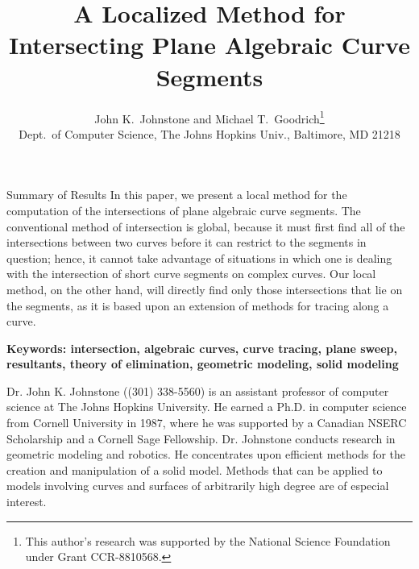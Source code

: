 \newif\ifFull
\Fulltrue		

\DoubleSpace
\setlength{\oddsidemargin}{0pt}
\setlength{\evensidemargin}{0pt}
\setlength{\headsep}{0pt}
\setlength{\topmargin}{0pt}
\setlength{\textheight}{8.75in}
\setlength{\textwidth}{6.5in}
%
\title{A Localized Method for Intersecting Plane Algebraic Curve Segments}
\author{John K.\ Johnstone and Michael T.\ Goodrich\thanks{This 
	author's research was supported by
	the National Science Foundation under Grant CCR-8810568.}
	\\[5pt]
	Dept.\ of Computer Science, The Johns Hopkins Univ., Baltimore,
	MD 21218}
%

%
\maketitle
%
\begin{summary}{Summary of Results}
In this paper, we present a local method for the 
computation of the intersections of plane algebraic curve segments.
The conventional method of intersection is global, because it must first find all 
of the intersections between two curves before it can restrict to the segments in question;
hence, it cannot take advantage of situations in which one is dealing with the intersection of
short curve segments on complex curves.
Our local method, on the other hand, will directly find only those intersections that lie 
on the segments, as it is based upon an extension of methods for tracing along a curve.
\end{summary}

{\bf Keywords: intersection, algebraic curves, curve tracing, plane sweep, resultants,
	theory of elimination, geometric modeling, solid modeling}

Dr. John K. Johnstone ((301) 338-5560) is an assistant professor of computer science at The Johns Hopkins
University.  
He earned a Ph.D. in computer science from Cornell University in 1987, where he was supported by
a Canadian NSERC Scholarship and a Cornell Sage Fellowship.
Dr. Johnstone conducts research in geometric modeling and robotics.
He concentrates upon efficient methods for the creation and manipulation
of a solid model.
Methods that can be applied to models involving curves and surfaces of
arbitrarily high degree are of especial interest.

